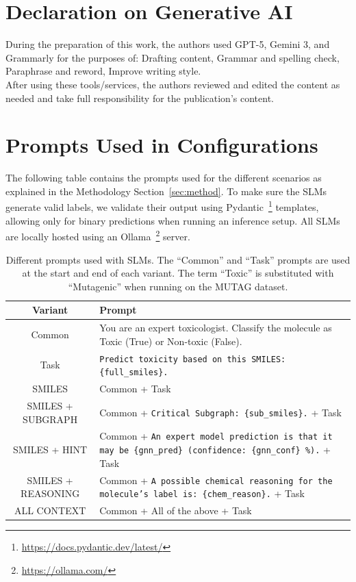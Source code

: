 \documentclass[
]{ceurart}
\begin{document}
\section*{Declaration on Generative AI}
During the preparation of this work, the authors used GPT-5, Gemini 3, and Grammarly for the purposes of: Drafting content, Grammar and spelling check, Paraphrase and reword, Improve writing style.\\ 
After using these tools/services, the authors reviewed and edited the content as needed and take full responsibility for the publication’s content. 



\appendix



\section{Prompts Used in Configurations}\label{sec:prompts}

The following table contains the prompts used for the different scenarios as explained in the Methodology Section~\ref{sec:method}. To make sure the SLMs generate valid labels, we validate their output using Pydantic~\footnote{\url{https://docs.pydantic.dev/latest/}} templates, allowing only for binary predictions when running an inference setup. All SLMs are locally hosted using an Ollama~\footnote{\url{https://ollama.com/}} server.


\begin{table}[ht]
\begin{small}

\centering
\caption{Different prompts used with SLMs. The ``Common'' and ``Task'' prompts are used at the start and end of each variant. The term ``Toxic'' is substituted with ``Mutagenic'' when running on the MUTAG dataset. }\label{tab:zero_shot_prompts}
\begin{tabularx}{\linewidth}{cX}
\hline
\textbf{Variant} & \textbf{Prompt}\\
\hline
Common & {\ttfamily You are an expert toxicologist. Classify the molecule as Toxic (True) or Non-toxic (False).} \\
Task & \texttt{Predict toxicity based on this SMILES: \{full\_smiles\}.} \\
\hline
SMILES & Common + Task \\
\hline
SMILES + SUBGRAPH & Common + \texttt{Critical Subgraph: \{sub\_smiles\}.} + Task \\
\hline
SMILES + HINT   & Common + \texttt{An expert model prediction is that it may be \{gnn\_pred\} (confidence: \{gnn\_conf\} \%).} + Task \\
\hline
SMILES + REASONING  & Common + \texttt{A possible chemical reasoning for the molecule's label is: \{chem\_reason\}.} + Task \\
\hline
ALL CONTEXT  & Common + All of the above + Task \\
\hline

\hline
\end{tabularx}
\end{small}
\end{table}
\end{document}
